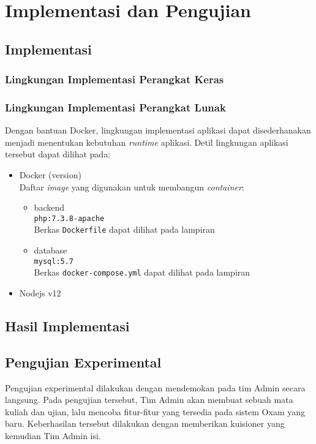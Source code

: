 \chapter{Implementasi dan Pengujian}
\label{chap:implementasi-pengujian}

\section{Implementasi}

\subsection{Lingkungan Implementasi Perangkat Keras}

\subsection{Lingkungan Implementasi Perangkat Lunak}
Dengan bantuan Docker, lingkungan implementasi aplikasi dapat disederhanakan menjadi menentukan
kebutuhan \textit{runtime} aplikasi. Detil lingkungan aplikasi tersebut dapat dilihat pada:
\begin{itemize}
    \item Docker (version)\\
        Daftar \textit{image} yang digunakan untuk membangun \textit{container}:
        \begin{itemize}
            \item backend\\
                \texttt{php:7.3.8-apache}\\
                Berkas \texttt{Dockerfile} dapat dilihat pada lampiran %
            
            \item database\\
                \texttt{mysql:5.7}\\
                Berkas \texttt{docker-compose.yml} dapat dilihat pada lampiran %
        \end{itemize}
    \item Nodejs v12
\end{itemize}

\section{Hasil Implementasi}


\section{Pengujian Experimental}
Pengujian experimental dilakukan dengan mendemokan pada tim Admin secara langsung. Pada pengujian
tersebut, Tim Admin akan membuat sebuah mata kuliah dan ujian, lalu mencoba fitur-fitur yang tersedia
pada sistem Oxam yang baru. Keberhasilan tersebut dilakukan dengan memberikan kuisioner yang kemudian
Tim Admin isi.

